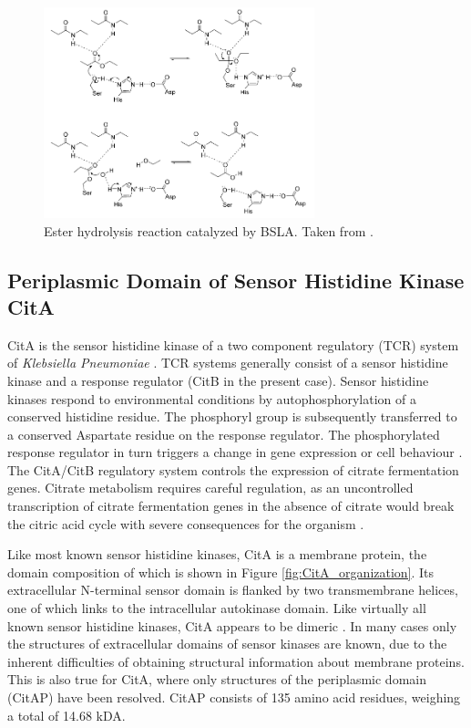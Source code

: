 \documentclass[english, a4paper, 12pt, titlepage, draft]{article}
\begin{document}
\begin{figure}
    \centering
    \includegraphics[width=0.7\textwidth]{figures/BSLA_reaction.png}
    \caption{Ester hydrolysis reaction catalyzed by BSLA. Taken from \cite{BSLA_reaction}.}
    \label{fig:BSLAreaction}
\end{figure}  






\subsection{Periplasmic Domain of Sensor Histidine Kinase CitA}

CitA is the sensor histidine kinase of a two component regulatory (TCR) system of \textit{Klebsiella Pneumoniae} \cite{CitA_original}.
TCR systems generally consist of a sensor histidine kinase and a response regulator (CitB in the present case).
Sensor histidine kinases respond to environmental conditions by autophosphorylation of a conserved histidine residue.
The phosphoryl group is subsequently transferred to a conserved Aspartate residue on the response regulator.
The phosphorylated response regulator in turn triggers a change in gene expression or cell behaviour \cite{CitA_original}.
The CitA/CitB regulatory system controls the expression of citrate fermentation genes.
Citrate metabolism requires careful regulation, as an uncontrolled transcription of citrate fermentation genes in the absence of citrate would break the citric acid cycle with severe consequences for the organism \cite{CitA_original}.

Like most known sensor histidine kinases, CitA is a membrane protein, the domain composition of which is shown in Figure \ref{fig:CitA_organization}.
Its extracellular N-terminal sensor domain is flanked by two transmembrane helices, one of which links to the intracellular autokinase domain.
Like virtually all known sensor histidine kinases, CitA appears to be dimeric \cite{2CST}.
In many cases only the structures of extracellular domains of sensor kinases are known, due to the inherent difficulties of obtaining structural information about membrane proteins.
This is also true for CitA, where only structures of the periplasmic domain (CitAP) have been resolved.
CitAP consists of 135 amino acid residues, weighing a total of 14.68 kDA.
\end{document}
